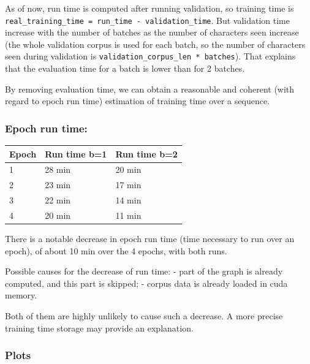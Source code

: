 As of now, run time is computed after running validation, so training
time is \lstinline!real_training_time = run_time - validation_time!. But
validation time increase with the number of batches as the number of
characters seen increase (the whole validation corpus is used for each
batch, so the number of characters seen during validation is
\lstinline!validation_corpus_len * batches!). That explains that the
evaluation time for a batch is lower than for 2 batches.

By removing evaluation time, we can obtain a reasonable and coherent
(with regard to epoch run time) estimation of training time over a
sequence.

\subsubsection{Epoch run time:}\label{epoch-run-time}

\begin{longtable}[]{@{}lll@{}}
\toprule
Epoch & Run time b=1 & Run time b=2\tabularnewline
\midrule
\endhead
1 & 28 min & 20 min\tabularnewline
2 & 23 min & 17 min\tabularnewline
3 & 22 min & 14 min\tabularnewline
4 & 20 min & 11 min\tabularnewline
\bottomrule
\end{longtable}

There is a notable decrease in epoch run time (time necessary to run
over an epoch), of about 10 min over the 4 epochs, with both runs.

Possible causes for the decrease of run time: - part of the graph is
already computed, and this part is skipped; - corpus data is already
loaded in cuda memory.

Both of them are highly unlikely to cause such a decrease. A more
precise training time storage may provide an explanation.

\subsubsection{Plots}\label{plots}

